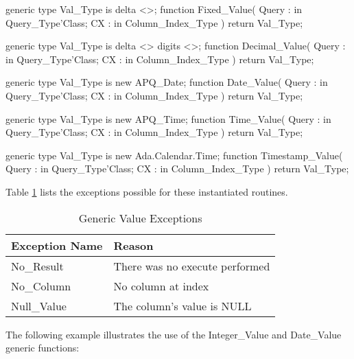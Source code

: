 \documentclass[english,letterpaper]{book}
\begin{document}
\begin{Code}
generic
   type Val_Type is delta <>;
function Fixed_Value(
   Query : in Query_Type'Class;
   CX :    in Column_Index_Type
) return Val_Type;
\end{Code}

\begin{Code}
generic
   type Val_Type is delta <> digits <>;
function Decimal_Value(
   Query : in Query_Type'Class;
   CX :    in Column_Index_Type
) return Val_Type;
\end{Code}

\begin{Code}
generic
   type Val_Type is new APQ_Date;
function Date_Value(
   Query : in Query_Type'Class;
   CX :    in Column_Index_Type
) return Val_Type;
\end{Code}

\begin{Code}
generic
   type Val_Type is new APQ_Time;
function Time_Value(
   Query : in Query_Type'Class;
   CX :    in Column_Index_Type
) return Val_Type;
\end{Code}

\begin{Code}
generic
   type Val_Type is new Ada.Calendar.Time;
function Timestamp_Value(
   Query : in Query_Type'Class;
   CX :    in Column_Index_Type
) return Val_Type;
\end{Code}

Table \ref{t:gvalx} lists the exceptions possible for these
instantiated routines.

\begin{table}
   \begin{center}
      \begin{tabular}{ll}
         Exception Name    &  Reason\\
         \hline 
         No\_Result        &  There was no execute performed\\
         No\_Column        &  No column at index\\
         Null\_Value       &  The column's value is NULL\\
      \end{tabular}
   \end{center}
   \caption{Generic Value Exceptions}\label{t:gvalx}
\end{table}

The following example illustrates the use of the Integer\_Value and
Date\_Value generic functions:
\end{document}
